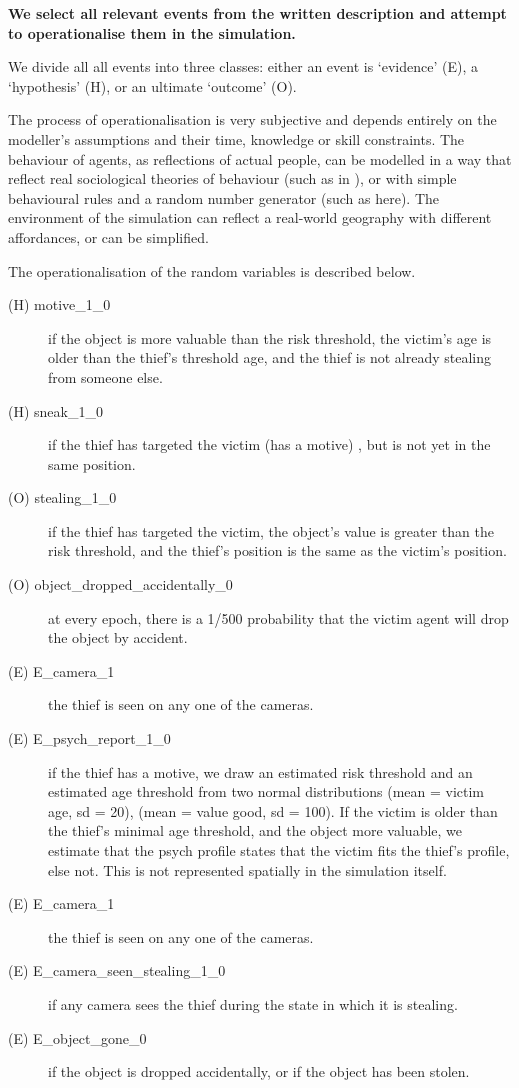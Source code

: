 \documentclass[11pt]{article}
\begin{document}
\item \textbf{We select all relevant events from the written description and attempt to operationalise them in the simulation.}

We divide all all events into three classes: either an event is `evidence' (E), a `hypothesis' (H), or an ultimate `outcome' (O). 

The process of operationalisation is very subjective and depends entirely on the modeller's assumptions and their time, knowledge or skill constraints. The behaviour of agents, as reflections of actual people, can be modelled in a way that reflect real sociological theories of behaviour (such as in \citet{Gerritsen2015}), or with simple behavioural rules and a random number generator (such as here). The environment of the simulation can reflect a real-world geography with different affordances, or can be simplified. 

The operationalisation of the random variables is described below. 
\begin{description}
\item[(H) motive\_1\_0 ] if the object is more valuable than the risk threshold, the victim's age is older than the thief's threshold age, and the thief is not already stealing from someone else. 
\item[(H) sneak\_1\_0 ] if the thief has targeted the victim (has a motive) , but is not yet in the same position.
\item[(O) stealing\_1\_0 ] if the thief has targeted the victim, the object's value is greater than the risk threshold, and the thief's position is the same as the victim's position. 
\item[(O) object\_dropped\_accidentally\_0 ] at every epoch, there is a 1/500 probability that the victim agent will drop the object by accident.
\item[(E) E\_camera\_1 ] the thief is seen on any one of the cameras.
\item[(E) E\_psych\_report\_1\_0 ] if the thief has a motive, we draw an estimated risk threshold and an estimated age threshold from two normal distributions (mean = victim age, sd = 20), (mean = value good, sd = 100). If the victim is older than the thief's minimal age threshold, and the object more valuable, we estimate that the psych profile states that the victim fits the thief's profile, else not. This is not represented spatially in the simulation itself.
\item[(E) E\_camera\_1 ] the thief is seen on any one of the cameras.
\item[(E) E\_camera\_seen\_stealing\_1\_0 ]  if any camera sees the thief during the state in which it is stealing.
\item[(E) E\_object\_gone\_0 ] if the object is dropped accidentally, or if the object has been stolen.
\end{description}
\end{document}
